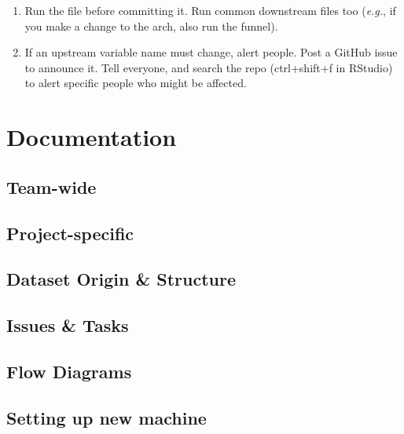 \documentclass[
]{book}
\providecommand{\tightlist}{%
  \setlength{\itemsep}{0pt}\setlength{\parskip}{0pt}}
\begin{document}
\begin{enumerate}
\def\labelenumi{\arabic{enumi}.}
\tightlist
\item
  Run the file before committing it. Run common downstream files too (\emph{e.g.}, if you make a change to the arch, also run the funnel).
\item
  If an upstream variable name must change, alert people. Post a GitHub issue to announce it. Tell everyone, and search the repo (ctrl+shift+f in RStudio) to alert specific people who might be affected.
\end{enumerate}

\hypertarget{document}{%
\chapter{Documentation}\label{document}}

\hypertarget{team-wide}{%
\section{Team-wide}\label{team-wide}}

\hypertarget{project-specific}{%
\section{Project-specific}\label{project-specific}}

\hypertarget{dataset-origin-structure}{%
\section{Dataset Origin \& Structure}\label{dataset-origin-structure}}

\hypertarget{issues-tasks}{%
\section{Issues \& Tasks}\label{issues-tasks}}

\hypertarget{flow-diagrams}{%
\section{Flow Diagrams}\label{flow-diagrams}}

\hypertarget{setting-up-new-machine}{%
\section{Setting up new machine}\label{setting-up-new-machine}}
\end{document}
